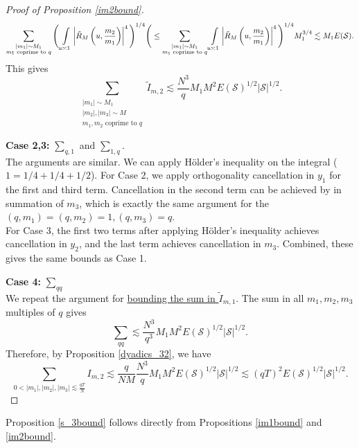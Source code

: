 \begin{proof}[{Proof of Proposition \ref{im2bound}}]
\[       \sum_{\substack{|m_1|\sim M_1\\ m_1\textrm{ coprime to }q}} \Bigg(\int\displaylimits_{u\asymp 1}  \left| \tilde{R}_M\left(u,\frac{m_2}{m_1}\right)\right|^4\Bigg)^{1/4}\Bigg(\leq \sum_{\substack{|m_1|\sim M_1\\ m_1\textrm{ coprime to }q}} \int\displaylimits_{u\asymp 1}  \left| \tilde{R}_M\left(u,\frac{m_2}{m_1}\right)\right|^4\Bigg)^{1/4} M_1^{3/4} \lesssim M_1 E(\mathcal{S}).
    \]
    This gives \[
    \sum_{\substack{|m_1|\sim M_1\\|m_2|,|m_3|\sim M\\
    m_1,m_2 \textrm{ coprime to } q}} \tilde{I}_{m,2} \lesssim \frac{N^3}{q}M_1M^2 E(\mathcal{S})^{1/2}|\mathcal{S}|^{1/2}.
    \]

    \textbf{Case 2,3:} $\sum_{q,1}$ and $\sum_{1,q}$. 
    \\
    The arguments are similar. We can apply H\"older's inequality on the integral ($1=1/4+1/4+1/2$). For Case 2, we apply orthogonality cancellation in $y_1$ for the first and third term. Cancellation in the second term can be achieved by in summation of $m_3$, which is exactly the same argument for the $(q,m_1)=(q,m_2)=1, (q,m_3)=q$. \\
    For Case 3, the first two terms after applying H\"older's inequality achieves cancellation in $y_2$, and the last term achieves cancellation in $m_3$. Combined, these gives the same bounds as Case 1.

    \textbf{Case 4:} $\sum_{qq}$\\
    We repeat the argument for \hyperref[im1boundproof]{bounding the sum in $\tilde{I}_{m,1}$}. The sum in all $m_1,m_2,m_3$ multiples of $q$ gives
    \[  
        \sum_{qq}\lesssim \frac{N^3}{q^3}M_1M^2E(\mathcal{S})^{1/2}|\mathcal{S}|^{1/2}.
    \]
    Therefore, by Proposition \ref{dyadics_32}, we have \[
    \sum_{0<|m_1|,|m_2|,|m_3|\lesssim \frac{qT}{N}} I_{m,2} \lesssim \frac{q}{NM}\frac{N^3}{q}M_1M^2E(\mathcal{S})^{1/2}|\mathcal{S}|^{1/2}\lesssim (qT)^2E(\mathcal{S})^{1/2}|\mathcal{S}|^{1/2}.
    \]
\end{proof}
Proposition \ref{s_3bound} follows directly from Propositions \ref{im1bound} and \ref{im2bound}.